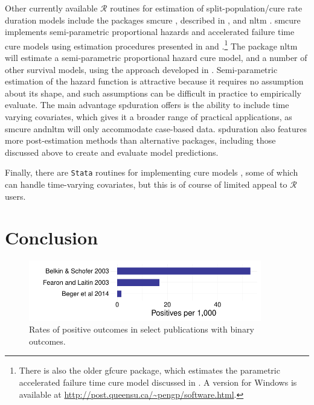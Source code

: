 \documentclass[12pt,onesided]{amsart}
\newcommand{\pkg}[1]{{\fontseries{b}\selectfont #1}}
\begin{document}
Other currently available $\mathcal{R}$ routines for estimation of split-population/cure rate duration models include the packages \pkg{smcure}  \citep{cai2012smcureR}, described in \citet{cai2012smcure}, and \pkg{nltm} \citep{garibotti2010nltm}. \pkg{smcure} implements semi-parametric proportional hazards and accelerated failure time cure models using estimation procedures presented in \citet{peng2003fitting} and \citet{zhang2007new}.\footnote{There is also the older \pkg{gfcure} package, which estimates the parametric accelerated failure time cure model discussed in \citet{peng1998generalized}. A version for Windows is available at \url{http://post.queensu.ca/~pengp/software.html}.} The package \pkg{nltm} will estimate a semi-parametric proportional hazard cure model, and a number of other survival models, using the approach developed in \citet{tsodikov2003semiparametric,tsodikov2007profile}. Semi-parametric estimation of the hazard function is attractive because it requires no assumption about its shape, and such assumptions can be difficult in practice to empirically evaluate. The main advantage \pkg{spduration} offers is the ability to include time varying covariates, which gives it a broader range of practical applications, as \pkg{smcure} and\pkg{nltm} will only accommodate case-based data. \pkg{spduration} also features more post-estimation methods than alternative packages, including those discussed above to create and evaluate model predictions.  

Finally, there are \texttt{Stata} routines for implementing cure models \citep[see, e.g.,][]{lambert2007modeling,buxton2013cureregr}, some of which can handle time-varying covariates, but this is of course of limited appeal to $\mathcal{R}$ users. 

\section{Conclusion}

\begin{figure}[htbp!]
\centering
\includegraphics[width = 4in]{graphics/rates.pdf}
\caption{Rates of positive outcomes in select publications with binary outcomes.}
\label{rates}
\end{figure}
\end{document}
